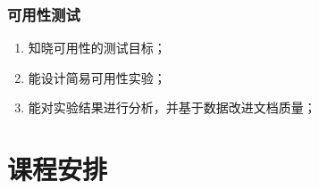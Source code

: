 \documentclass[letterpaper,10pt,english]{sphinxmanual}
\begin{document}
\subsection{可用性测试}
\label{\detokenize{about/tw-comp-model:id18}}\begin{enumerate}
%
\item {} 
\sphinxAtStartPar
知晓可用性的测试目标；

\item {} 
\sphinxAtStartPar
能设计简易可用性实验；

\item {} 
\sphinxAtStartPar
能对实验结果进行分析，并基于数据改进文档质量；

\end{enumerate}

\sphinxstepscope


\chapter{课程安排}
\label{\detokenize{about/syllabus-cat:id1}}\label{\detokenize{about/syllabus-cat::doc}}
\end{document}

